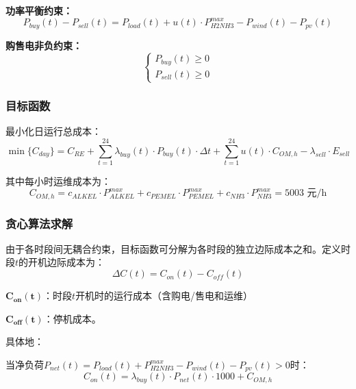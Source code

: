 \textbf{功率平衡约束：}
\begin{equation}
P_{buy}(t) - P_{sell}(t) = P_{load}(t) + u(t) \cdot P_{H2NH3}^{max} - P_{wind}(t) - P_{pv}(t)
\end{equation}

\textbf{购售电非负约束：}
\begin{equation}
\begin{cases}
    P_{buy}(t) \geq 0\\
    P_{sell}(t) \geq 0
\end{cases}
\end{equation}

\subsubsection{目标函数}

最小化日运行总成本：
\begin{equation}\label{eq:q2_obj}
\min \{C_{day}\} = C_{RE} + \sum_{t=1}^{24} \lambda_{buy}(t) \cdot P_{buy}(t) \cdot \Delta t + \sum_{t=1}^{24} u(t) \cdot C_{OM,h} - \lambda_{sell} \cdot E_{sell}
\end{equation}

其中每小时运维成本为：
\begin{equation}
C_{OM,h} = c_{ALKEL} \cdot P_{ALKEL}^{max} + c_{PEMEL} \cdot P_{PEMEL}^{max} + c_{NH3} \cdot P_{NH3}^{max} = 5003 \text{ 元/h}
\end{equation}

\subsubsection{贪心算法求解}

由于各时段间无耦合约束，目标函数可分解为各时段的独立边际成本之和。定义时段$t$的开机边际成本为：
\begin{equation}\label{eq:greedy_marginal}
\Delta C(t) = C_{on}(t) - C_{off}(t)
\end{equation}
 
\quad \quad \quad \quad \quad $\mathbf{C_{on}(t)}$：时段$t$开机时的运行成本（含购电/售电和运维）
    
\quad \quad \quad \quad \quad $\mathbf{C_{off}(t)}$：停机成本。


具体地：

当净负荷$P_{net}(t) = P_{load}(t) + P_{H2NH3}^{max} - P_{wind}(t) - P_{pv}(t) > 0$时：
\begin{equation}
C_{on}(t) = \lambda_{buy}(t) \cdot P_{net}(t) \cdot 1000 + C_{OM,h}
\end{equation}

